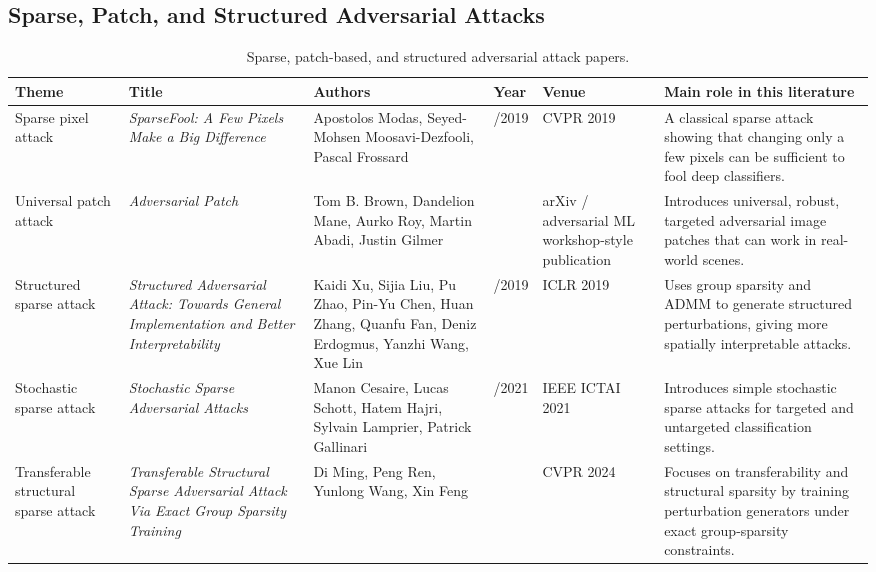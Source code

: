 \documentclass{article}
\begin{document}
\subsection{Sparse, Patch, and Structured Adversarial Attacks}

\begin{landscape}
\begin{table}[p]
\centering
\footnotesize
\begin{tabular}{>{\raggedright\arraybackslash}p{2.4cm} >{\raggedright\arraybackslash}p{4.0cm} >{\raggedright\arraybackslash}p{3.4cm} >{\raggedright\arraybackslash}p{1.0cm} >{\raggedright\arraybackslash}p{3.2cm} >{\raggedright\arraybackslash}p{6.2cm}}
\hline
\textbf{Theme} & \textbf{Title} & \textbf{Authors} & \textbf{Year} & \textbf{Venue} & \textbf{Main role in this literature} \\
\hline
Sparse pixel attack &
\textit{SparseFool: A Few Pixels Make a Big Difference} &
Apostolos Modas, Seyed-Mohsen Moosavi-Dezfooli, Pascal Frossard &
2018/2019 &
CVPR 2019 &
A classical sparse attack showing that changing only a few pixels can be sufficient to fool deep classifiers. \\
\hline
Universal patch attack &
\textit{Adversarial Patch} &
Tom B. Brown, Dandelion Mane, Aurko Roy, Martin Abadi, Justin Gilmer &
2017 &
arXiv / adversarial ML workshop-style publication &
Introduces universal, robust, targeted adversarial image patches that can work in real-world scenes. \\
\hline
Structured sparse attack &
\textit{Structured Adversarial Attack: Towards General Implementation and Better Interpretability} &
Kaidi Xu, Sijia Liu, Pu Zhao, Pin-Yu Chen, Huan Zhang, Quanfu Fan, Deniz Erdogmus, Yanzhi Wang, Xue Lin &
2018/2019 &
ICLR 2019 &
Uses group sparsity and ADMM to generate structured perturbations, giving more spatially interpretable attacks. \\
\hline
Stochastic sparse attack &
\textit{Stochastic Sparse Adversarial Attacks} &
Manon Cesaire, Lucas Schott, Hatem Hajri, Sylvain Lamprier, Patrick Gallinari &
2020/2021 &
IEEE ICTAI 2021 &
Introduces simple stochastic sparse attacks for targeted and untargeted classification settings. \\
\hline
Transferable structural sparse attack &
\textit{Transferable Structural Sparse Adversarial Attack Via Exact Group Sparsity Training} &
Di Ming, Peng Ren, Yunlong Wang, Xin Feng &
2024 &
CVPR 2024 &
Focuses on transferability and structural sparsity by training perturbation generators under exact group-sparsity constraints. \\
\hline
\end{tabular}
\caption{Sparse, patch-based, and structured adversarial attack papers.}
\end{table}
\end{landscape}
\end{document}
